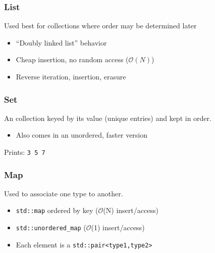 \documentclass[xcolor=dvipsnames]{beamer}
\begin{document}
\begin{frame}[fragile]
  \frametitle{List}

  Used best for collections where order may be determined later
  \begin{itemize}
  \item ``Doubly linked list'' behavior
  \item Cheap insertion, no random access ($\mathcal{O}(N)$)
  \item Reverse iteration, insertion, erasure
  \end{itemize}

  
\end{frame}

\begin{frame}[fragile]
  \frametitle{Set}

  An collection keyed by its value (unique entries) and kept in order.
  \begin{itemize}
  \item Also comes in an unordered, faster version   
  \end{itemize}

  

  Prints: \texttt{3 5 7}
\end{frame}


\begin{frame}[fragile]
  \frametitle{Map}

  Used to associate one type to another.
  \begin{itemize}
  \item \texttt{std::map} ordered by key ($\mathcal{O}$(N) insert/access)
  \item \texttt{std::unordered\_map} ($\mathcal{O}$(1) insert/access)
  \item Each element is a \texttt{std::pair<type1,type2>}
  \end{itemize}

  

\end{frame}
\end{document}
